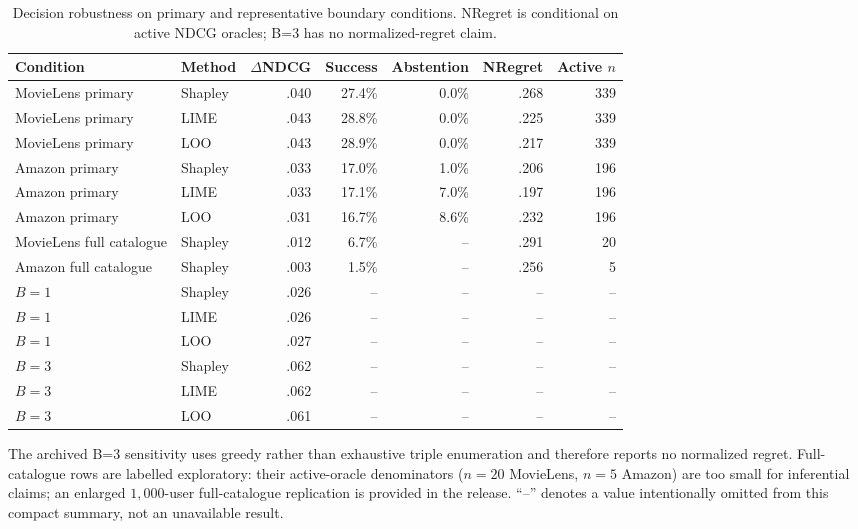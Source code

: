 \begin{table}[!htbp]
\centering\scriptsize
\caption{Decision robustness on primary and representative boundary conditions. NRegret is conditional on active NDCG oracles; B=3 has no normalized-regret claim.}
\label{tab:app-decisions}
\setlength{\tabcolsep}{3pt}
\begin{tabular}{@{}p{}p{}rrrrr@{}}
\toprule
Condition & Method & $\Delta$NDCG & Success & Abstention & NRegret & Active $n$ \\
\midrule
MovieLens primary & Shapley & .040 & 27.4\% & 0.0\% & .268 & 339 \\
MovieLens primary & LIME & .043 & 28.8\% & 0.0\% & .225 & 339 \\
MovieLens primary & LOO & .043 & 28.9\% & 0.0\% & .217 & 339 \\
Amazon primary & Shapley & .033 & 17.0\% & 1.0\% & .206 & 196 \\
Amazon primary & LIME & .033 & 17.1\% & 7.0\% & .197 & 196 \\
Amazon primary & LOO & .031 & 16.7\% & 8.6\% & .232 & 196 \\
MovieLens full catalogue & Shapley & .012 & 6.7\% & -- & .291 & 20 \\
Amazon full catalogue & Shapley & .003 & 1.5\% & -- & .256 & 5 \\
\midrule
$B=1$ & Shapley & .026 & -- & -- & -- & -- \\
$B=1$ & LIME & .026 & -- & -- & -- & -- \\
$B=1$ & LOO & .027 & -- & -- & -- & -- \\
$B=3$ & Shapley & .062 & -- & -- & -- & -- \\
$B=3$ & LIME & .062 & -- & -- & -- & -- \\
$B=3$ & LOO & .061 & -- & -- & -- & -- \\
\bottomrule
\end{tabular}
\end{table}

\noindent The archived B=3 sensitivity uses greedy rather than exhaustive triple enumeration and therefore reports no normalized regret. Full-catalogue rows are labelled exploratory: their active-oracle denominators ($n=20$ MovieLens, $n=5$ Amazon) are too small for inferential claims; an enlarged $1{,}000$-user full-catalogue replication is provided in the release. ``--'' denotes a value intentionally omitted from this compact summary, not an unavailable result.